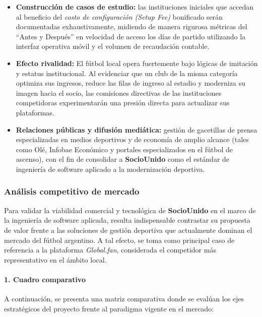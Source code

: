 \begin{itemize}
    \item \textbf{Construcción de casos de estudio:} las instituciones iniciales que accedan al beneficio del \textit{costo de configuración (Setup Fee)} bonificado serán documentadas exhaustivamente, midiendo de manera rigurosa métricas del ``Antes y Después'' en velocidad de acceso los días de partido utilizando la interfaz operativa móvil y el volumen de recaudación contable.
    \item \textbf{Efecto rivalidad:} El fútbol local opera fuertemente bajo lógicas de imitación y estatus institucional. Al evidenciar que un club de la misma categoría optimiza sus ingresos, reduce las filas de ingreso al estadio y moderniza su imagen hacia el socio, las comisiones directivas de las instituciones competidoras experimentarán una presión directa para actualizar sus plataformas.
    \item \textbf{Relaciones públicas y difusión mediática:} gestión de gacetillas de prensa especializadas en medios deportivos y de economía de amplio alcance (tales como Olé, Infobae Económico y portales especializados en el fútbol de ascenso), con el fin de consolidar a \textbf{SocioUnido} como el estándar de ingeniería de software aplicado a la modernización deportiva.
\end{itemize}

\newpage

\subsubsection{Análisis competitivo de mercado}

Para validar la viabilidad comercial y tecnológica de \textbf{SocioUnido} en el marco de la ingeniería de software aplicada, resulta indispensable contrastar su propuesta de valor frente a las soluciones de gestión deportiva que actualmente dominan el mercado del fútbol argentino. A tal efecto, se toma como principal caso de referencia a la plataforma \textit{Global.fan}, considerada el competidor más representativo en el ámbito local.

\paragraph{1. Cuadro comparativo}

A continuación, se presenta una matriz comparativa donde se evalúan los ejes estratégicos del proyecto frente al paradigma vigente en el mercado:

